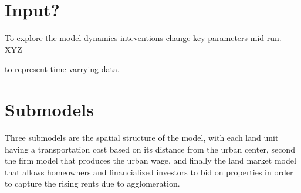 \section{Input?}
To explore the model dynamics inteventions change key parameters mid run. XYZ

to represent time varrying data. 

\section{Submodels}
Three submodels are the spatial structure of the model, with each land unit having a transportation cost based on its distance from the urban center, second the firm model that produces the urban wage, and finally the land market model that allows homeowners and financialized investors to bid on properties in order to capture the rising rents due to agglomeration.  